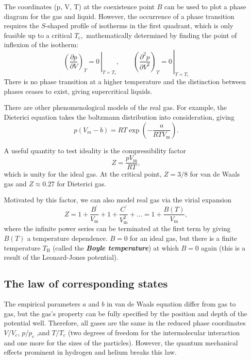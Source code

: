 \documentclass{article}
\theoremstyle{nonumberplain}
\begin{document}
The coordinates (p, V, T) at the coexistence point $B$ can be used to plot a phase diagram for the gas and liquid. However, the occurrence of a phase transition requires the $S$-shaped profile of isotherms in the first quadrant, which is only feasible up to a critical $T_\mathrm{c},$ mathematically determined by finding the point of inflexion of the isotherm:
\[
    \boxed{
        \left. \left(\frac{\partial p}{\partial V} \right)_T  = 0 \, \right \vert_{T= T_c}, \qquad
        \left. \left(\frac{\partial^{2}  p}{\partial V^{2} } \right)_T  = 0 \, \right \vert_{T= T_c}
    }
\]
There is no phase transition at a higher temperature and the distinction between phases ceases to exist, giving supercritical liquids.

There are other phenomenological models of the real gas. For example, the Dieterici equation takes the boltzmann distribution into consideration, giving 
\[
    p (V_m - b) = RT \mathrm{\exp } \left( -\frac{a}{RT V_\mathrm{m} }\right).
\]

A useful quantity to test ideality is the compressibility factor 
\[
    Z = \frac{pV_\mathrm{m} }{RT}, 
\]
which is unity for the ideal gas. At the critical point, $Z = 3 /8$ for van de Waals gas and $Z \approx 0.27 $ for Dieterici gas. 

Motivated by this factor, we can also model real gas via the virial expansion 
\[
    Z = 1 + \frac{B^\prime }{V_\mathrm{m}  } + 1 + \frac{C^\prime }{V_\mathrm{m}^2  } + \ldots  
    = 1 + \frac{B(T)}{V_\mathrm{m} }, 
\]
where the infinite power series can be terminated at the first term by giving $B(T)$ a temperature dependence. $B = 0$ for an ideal gas, but there is a finite temperature $T_\mathrm{B} $ (called the \textit{\textbf{Boyle temperature}}) at which $B = 0$ again (this is a result of the Leonard-Jones potential). 

\subsection{The law of corresponding states}
The empirical parameters $a$ and $b$ in van de Waals equation differ from gas to gas, but the gas's property can be fully specified by the position and depth of the potential well. Therefore, all gases are the same in the reduced phase coordinates $V/V_c$, $p / p_c$ ,and $T / T_c$ (two degrees of freedom for the intermolecular interaction and one more for the sizes of the particles). However, the quantum mechanical effects prominent in hydrogen and helium breaks this law. 
\end{document}
